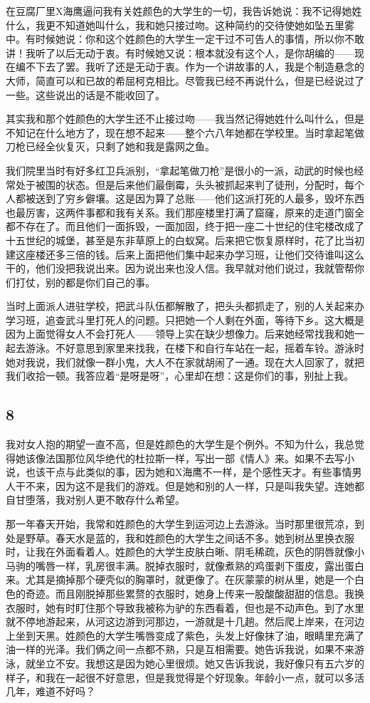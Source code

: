 在豆腐厂里X海鹰逼问我有关姓颜色的大学生的一切，我告诉她说：我不记得她姓什么，我更不知道她叫什么，我和她只接过吻。这种简约的交待使她如坠五里雾中。有时候她说：你和这个姓颜色的大学生一定干过不可告人的事情，所以你不敢讲！我听了以后无动于衷。有时候她又说：根本就没有这个人，是你胡编的——现在编不下去了罢。我听了还是无动于衷。作为一个讲故事的人，我是个制造悬念的大师，简直可以和已故的希屈柯克相比。尽管我已经不再说什么，但是已经说过了一些。这些说出的话是不能收回了。 

其实我和那个姓颜色的大学生还不止接过吻——我当然记得她姓什么叫什么，但是不知记在什么地方了，现在想不起来——整个六八年她都在学校里。当时拿起笔做刀枪已经全伙复灭，只剩了她和我是露网之鱼。 

我们院里当时有好多红卫兵派别，“拿起笔做刀枪”是很小的一派，动武的时候也经常处于被围的状态。但是后来他们最倒霉，头头被抓起来判了徒刑，分配时，每个人都被送到了穷乡僻壤。这是因为算了总账——他们这派打死的人最多，毁坏东西也最厉害，这两件事都和我有关系。我们那座楼里打满了窟窿，原来的走道门窗全都不存在了。而且他们一面拆毁，一面加固，终于把一座二十世纪的住宅楼改成了十五世纪的城堡，甚至是东非草原上的白蚁窝。后来把它恢复原样时，花了比当初建这座楼还多三倍的钱。后来上面把他们集中起来办学习班，让他们交待谁叫这么干的，他们没把我说出来。因为说出来也没人信。我早就对他们说过，我就管帮你们打仗，别的都是你们自己的事。 

当时上面派人进驻学校，把武斗队伍都解散了，把头头都抓走了，别的人关起来办学习班，追查武斗里打死人的问题。只把她一个人剩在外面，等待下乡。这大概是因为上面觉得女人不会打死人——领导上实在缺少想像力。后来她经常找我和她一起去游泳。不好意思到家里来找我，在楼下和自行车站在一起，摇着车铃。游泳时她对我说，我们就像一群小鬼，大人不在家就胡闹了一通。现在大人回家了，就把我们收拾一顿。我答应着“是呀是呀”，心里却在想：这是你们的事，别扯上我。 

\subsection{8} 

我对女人抱的期望一直不高，但是姓颜色的大学生是个例外。不知为什么，我总觉得她该像法国那位风华绝代的杜拉斯一样，写出一部《情人》来。如果不去写小说，也该干点与此类似的事，因为她和X海鹰不一样，是个感性天才。有些事情男人干不来，因为这不是我们的游戏。但是她和别的人一样，只是叫我失望。连她都自甘堕落，我对别人更不敢存什么希望。 

那一年春天开始，我常和姓颜色的大学生到运河边上去游泳。当时那里很荒凉，到处是野草。春天水是蓝的，我和姓颜色的大学生之间话不多。她到树丛里换衣服时，让我在外面看着人。姓颜色的大学生皮肤白晰、阴毛稀疏，灰色的阴唇就像小马驹的嘴唇一样，乳房很丰满。脱掉衣服时，就像煮熟的鸡蛋剥下蛋皮，露出蛋白来。尤其是摘掉那个硬壳似的胸罩时，就更像了。在灰蒙蒙的树从里，她是一个白色的奇迹。而且刚脱掉那些累赘的衣服时，她身上传来一股酸酸甜甜的信息。我换衣服时，她有时盯住那个导致我被称为驴的东西看着，但也是不动声色。到了水里就不停地游起来，从河这边游到河那边，一游就是十几趟。然后爬上岸来，在河边上坐到天黑。姓颜色的大学生嘴唇变成了紫色，头发上好像抹了油，眼睛里充满了油一样的光泽。我们俩之间一点都不熟，只是互相需要。她告诉我说，如果不来游泳，就坐立不安。我想这是因为她心里很烦。她又告诉我说，我好像只有五六岁的样子，和我在一起很不好意思，但是我觉得是个好现象。年龄小一点，就可以多活几年，难道不好吗？ 

